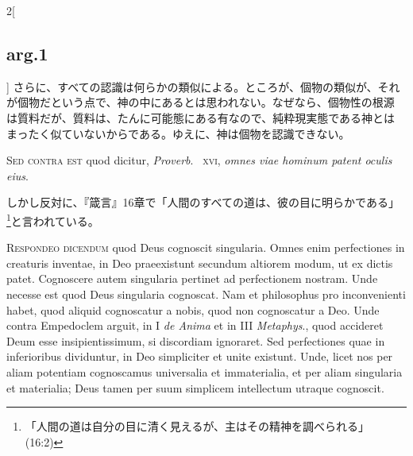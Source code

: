 \documentclass[paper=a4paper,fontsize=10pt,jafontsize=9pt,titlepage]{jlreq}
\begin{document}
\begin{paracol}{2}[\subsection{arg.1}]
さらに、すべての認識は何らかの類似による。ところが、個物の類似が、それ
が個物だという点で、神の中にあるとは思われない。なぜなら、個物性の根源
は質料だが、質料は、たんに可能態にある有なので、純粋現実態である神とは
まったく似ていないからである。ゆえに、神は個物を認識できない。

\switchcolumn*[\subsection{s.c.}]

{\scshape Sed contra est} quod dicitur, {\itshape Proverb}.~{\scshape
xvi}, {\itshape omnes viae hominum patent oculis eius}.

\switchcolumn

しかし反対に、『箴言』16章で「人間のすべての道は、彼の目に明らかである」
\footnote{「人間の道は自分の目に清く見えるが、主はその精神を調べられる」
(16:2)}と言われている。


{\scshape Respondeo dicendum} quod Deus cognoscit singularia. Omnes
enim perfectiones in creaturis inventae, in Deo praeexistunt secundum
altiorem modum, ut ex dictis patet. Cognoscere autem singularia
pertinet ad perfectionem nostram. Unde necesse est quod Deus
singularia cognoscat. Nam et philosophus pro inconvenienti habet, quod
aliquid cognoscatur a nobis, quod non cognoscatur a Deo. Unde contra
Empedoclem arguit, in I {\itshape de Anima} et in III {\itshape
Metaphys}., quod accideret Deum esse insipientissimum, si discordiam
ignoraret. Sed perfectiones quae in inferioribus dividuntur, in Deo
simpliciter et unite existunt. Unde, licet nos per aliam potentiam
cognoscamus universalia et immaterialia, et per aliam singularia et
materialia; Deus tamen per suum simplicem intellectum utraque
cognoscit.

\switchcolumn


\end{paracol}
\end{document}
